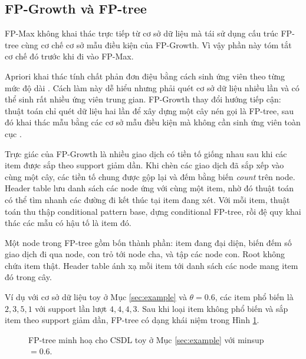 \subsection{FP-Growth và FP-tree}

FP-Max không khai thác trực tiếp từ cơ sở dữ liệu mà tái sử dụng cấu trúc FP-tree cùng cơ chế cơ sở mẫu điều kiện của FP-Growth. Vì vậy phần này tóm tắt cơ chế đó trước khi đi vào FP-Max.

Apriori khai thác tính chất phản đơn điệu bằng cách sinh ứng viên theo từng mức độ dài \cite{Agrawal1994FastAlgorithms}. Cách làm này dễ hiểu nhưng phải quét cơ sở dữ liệu nhiều lần và có thể sinh rất nhiều ứng viên trung gian. FP-Growth thay đổi hướng tiếp cận: thuật toán chỉ quét dữ liệu hai lần để xây dựng một cây nén gọi là FP-tree, sau đó khai thác mẫu bằng các cơ sở mẫu điều kiện mà không cần sinh ứng viên toàn cục \cite{Han2000FPGrowth}.

Trực giác của FP-Growth là nhiều giao dịch có tiền tố giống nhau sau khi các item được sắp theo support giảm dần. Khi chèn các giao dịch đã sắp xếp vào cùng một cây, các tiền tố chung được gộp lại và đếm bằng biến \textit{count} trên node. Header table lưu danh sách các node ứng với cùng một item, nhờ đó thuật toán có thể tìm nhanh các đường đi kết thúc tại item đang xét. Với mỗi item, thuật toán thu thập conditional pattern base, dựng conditional FP-tree, rồi đệ quy khai thác các mẫu có hậu tố là item đó.

Một node trong FP-tree gồm bốn thành phần: item đang đại diện, biến đếm số giao dịch đi qua node, con trỏ tới node cha, và tập các node con. Root không chứa item thật. Header table ánh xạ mỗi item tới danh sách các node mang item đó trong cây.

Ví dụ với cơ sở dữ liệu toy ở Mục \ref{sec:example} và $\theta = 0.6$, các item phổ biến là $2,3,5,1$ với support lần lượt $4,4,4,3$. Sau khi loại item không phổ biến và sắp item theo support giảm dần, FP-tree có dạng khái niệm trong Hình \ref{fig:fptree-toy}.

\begin{figure}[H]
    \centering
    \caption{FP-tree minh hoạ cho CSDL toy ở Mục \ref{sec:example} với minsup $=0.6$.}
    \label{fig:fptree-toy}
\end{figure}

